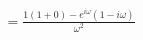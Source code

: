 \documentclass[preview]{standalone}
\begin{document}
\begin{align*}
&=\frac{1(1+0)-e^{i\omega}(1-i\omega)}{\omega^{2}} \\
\end{align*}
\end{document}
